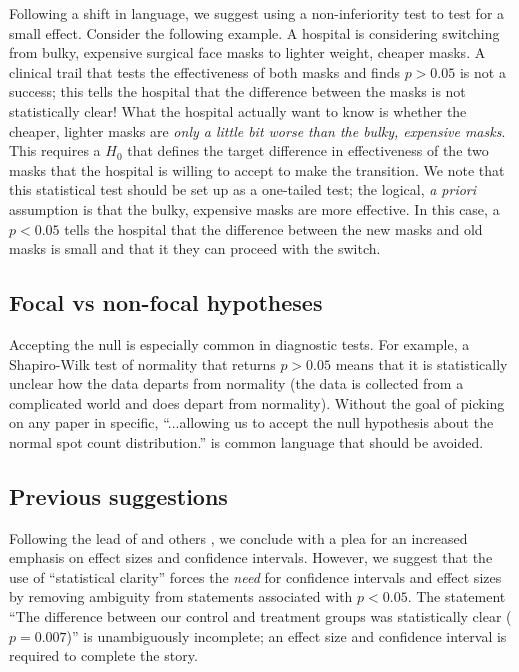 Following a shift in language, we suggest using a non-inferiority test to test for a small effect. Consider the following 
example. A hospital is considering switching from bulky, expensive surgical face masks to lighter weight, cheaper masks. A
clinical trail that tests the effectiveness of both masks and finds $p > 0.05$ is not a success; this tells the hospital 
that the difference between the masks is not statistically clear! What the hospital actually want to know is whether the 
cheaper, lighter masks are \emph{only a little bit worse than the bulky, expensive masks}. This requires a $H_{0}$ that 
defines the target difference in effectiveness of the two masks that the hospital is willing to accept to make the 
transition. We note that this statistical test should be set up as a one-tailed test; the logical, \emph{a priori} 
assumption is that the bulky, expensive masks are more effective. In this case, a $p < 0.05$ tells the hospital that the 
difference between the new masks and old masks is small and that it they can proceed with the switch.

\subsection*{Focal vs non-focal hypotheses}

Accepting the null is especially common in diagnostic tests. For example, a Shapiro-Wilk test of normality that
returns $p > 0.05$ means that it is statistically unclear how the data departs from normality (the data is collected
from a complicated world and does depart from normality). Without the goal of picking on any paper in specific, 
``...allowing us to accept the null hypothesis about the normal spot count distribution.'' \citep{Karulinetal.2015} 
is common language that should be avoided.

\subsection*{Previous suggestions}

Following the lead of \citet{Cohen1994} and others \citep{Goodman1999, ZiliakandMcCloskey2008, WassersteinandLazar2016},
we conclude with a plea for an increased emphasis on effect sizes and confidence intervals. However, we suggest that the
use of ``statistical clarity'' forces the \emph{need} for confidence intervals and effect sizes by removing ambiguity
from statements associated with $p < 0.05$. The statement ``The difference between our control and treatment groups was
statistically clear ($p = 0.007$)'' is unambiguously incomplete; an effect size and confidence interval 
is required to complete the story.

